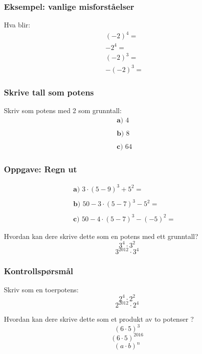 \documentclass{beamer}
\theoremstyle{definition}
\begin{document}
\begin{frame}
\frametitle{Eksempel: vanlige misforståelser}
Hva blir:
\huge
\begin{align*}
 (-2)^4 = &\\
 -2^4 = & \\
 (-2)^3 = &\\
 -(-2)^3 = &
\end{align*}
\normalsize
\end{frame}

\begin{frame}
\frametitle{Skrive tall som potens}
Skriv som potens med 2 som grunntall:
\begin{align*}
\textbf{a) } 4   & \\ \\
\textbf{b) } 8   & \\ \\
\textbf{c) } 64  &
\end{align*}
\end{frame}

\begin{frame}
\frametitle{Oppgave: Regn ut}
\huge
\begin{align*}
\textbf{a) } 3\cdot(5 - 9)^3 + 5^2 = &\\ \\
\textbf{b) } 50 - 3\cdot(5 - 7)^3 - 5^2 = & \\ \\
\textbf{c) } 50 - 4\cdot(5 - 7)^3 - (-5)^2 = &
\end{align*}
\normalsize
\end{frame}

\begin{frame}
Hvordan kan dere skrive dette som en potens med ett grunntall?
\huge\[3^4\cdot3^2\]
\huge\[3^{2012}\cdot3^4\]
\end{frame}

\begin{frame}
\frametitle{Kontrollspørsmål}
Skriv som en toerpotens:
\huge\[2^4\cdot2^2\]
\huge\[2^{2012}\cdot2^4\]
\end{frame}

\begin{frame}
Hvordan kan dere skrive dette som et produkt av to potenser ?
\huge\[(6\cdot5)^3\]
\huge\[(6\cdot5)^{2016}\]
\huge\[(a\cdot b)^{n}\]
\end{frame}
\end{document}
